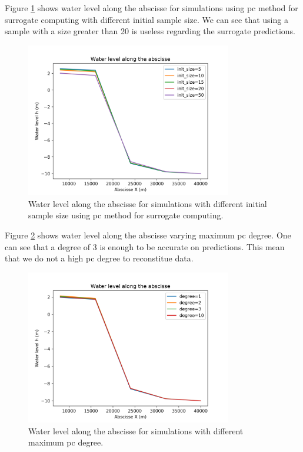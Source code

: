 Figure \ref{influence_init_size_method_surrogate_pc} shows water level along the abscisse for simulations using pc method for surrogate computing with different initial sample size. We can see that using a sample with a size greater than 20 is useless regarding the surrogate predictions.
\begin{figure}
  \centering
  \includegraphics[width=0.8\textwidth]{images/influence_init_size_method_surrogate_pc.png}
  \caption{Water level along the abscisse for simulations with different initial sample size using pc method for surrogate computing.}
  	\label{influence_init_size_method_surrogate_pc}
\end{figure}

Figure \ref{influence_degree_method_surrogate_pc} shows water level along the abscisse varying maximum pc degree. One can see that a degree of 3 is enough to be accurate on predictions. This mean that we do not a high pc degree to reconstitue data.
\begin{figure}
  \centering
  \includegraphics[width=0.8\textwidth]{images/influence_degree_method_surrogate_pc.png}
  \caption{Water level along the abscisse for simulations with different maximum pc degree.}
  	\label{influence_degree_method_surrogate_pc}
\end{figure}


